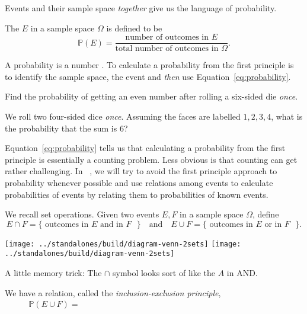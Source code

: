 \documentclass[../main.tex]{subfiles}
\begin{document}
Events and their sample space \emph{together} give us the language of probability.
\begin{definition}[probability]
  The  \(E\) in a sample space \(\Omega\) is defined to be
  \begin{equation} \label{eq:probability}
    \mathbb{P}(E) = \frac{\text{number of outcomes in \(E\)}}{\text{total number of outcomes in \(\Omega\)}}.
  \end{equation}
\end{definition}
A probability is a number \underline{\hspace{3in}}. To calculate a probability from the first principle is to identify the sample space, the event and \emph{then} use Equation~\eqref{eq:probability}.
\begin{example}
  Find the probability of getting an even number after rolling a six-sided die \emph{once}.
\end{example}
\clearpage

\begin{example}
  We roll two four-sided dice \emph{once}.  Assuming the faces are labelled \(1,2,3,4\), what is the probability that the sum is \(6\)?

\end{example}


\faStar{} Equation~\eqref{eq:probability} tells us that calculating a probability from the first principle is essentially a counting problem. Less obvious is that counting can get rather challenging. In \thecoursesubject~\thecoursenumb, we will try to avoid the first principle approach to probability whenever possible and use relations among events to calculate probabilities of events by relating them to probabilities of known events.

We recall set operations. Given two events \(E,F\) in a sample space \(\Omega\), define
\[
  E \cap F = \{\text{ outcomes in \(E\) and in \(F\) } \} \quad\text{and}\quad
  E \cup F = \{\text{ outcomes in \(E\) or in \(F\) } \}.
\]
\begin{center}
  \texttt{[image: ../standalones/build/diagram-venn-2sets]}
  \hspace{3em}
  \texttt{[image: ../standalones/build/diagram-venn-2sets]}
\end{center}
{\footnotesize A little memory trick: The \(\cap\) symbol looks sort of like the \(A\) in AND.}

\faStar{} We have a relation, called the \emph{inclusion-exclusion principle}, 
\begin{align} \label{eq:probability-cup-cap}
  \mathbb{P}( E \cup F ) = \hspace{4in}
\end{align}
\end{document}
